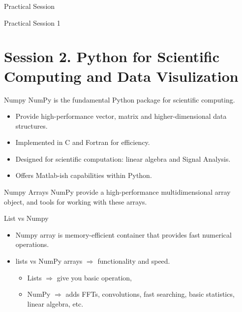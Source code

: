 \documentclass{bredelebeamer}
\begin{document}
\begin{frame}{Practical Session}

\centering
{\LARGE
    Practical Session 1
}
\end{frame}


\section{Session 2. Python for Scientific Computing and Data Visulization}

\begin{frame}{Numpy}
NumPy is the fundamental Python package for scientific computing.
\begin{itemize}
	\item Provide high-performance vector, matrix and higher-dimensional data structures.
	\item Implemented in C and Fortran for efficiency.
	\item Designed for scientific computation: linear algebra and Signal Analysis.
	\item Offers Matlab-ish capabilities within Python.
\end{itemize}	

\end{frame}	

\begin{frame}{Numpy Arrays}
NumPy provide a high-performance multidimensional array object, and tools for working with these arrays.
\begin{exampleblock}{List vs Numpy}
\begin{itemize}
	\item  Numpy array is memory-efficient container that provides fast numerical operations.
	\item lists vs  NumPy arrays $\Rightarrow$ functionality and speed.
	\begin{itemize} 
	\item Lists $\Rightarrow$ give you basic operation, 
	\item  NumPy $\Rightarrow$ adds FFTs, convolutions, fast searching, basic statistics, linear algebra, etc.
    \end{itemize}
    
\end{itemize}
\end{exampleblock}	
\end{frame}	
\end{document}

